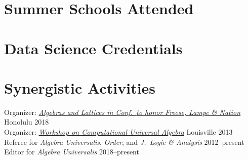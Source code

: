 \documentclass[margin,line]{resume}
\begin{document}
\begin{resume}

\vspace{-1mm}    
    \section{\mysidestyle Summer Schools Attended}

    

\vspace{-1mm}    
    \section{\mysidestyle Data Science Credentials}

    


    \section{\mysidestyle Synergistic Activities}


    \newcommand{\mytab}{\phantom{\textsl{Activities: }}}
    \renewcommand{\mytab}{\phantom{XX}}
    Organizer: \href{https://universalalgebra.github.io/ALH-2018/}
    {\emph{Algebras and Lattices in \Hawaii Conf.~{\small to honor Freese, Lampe \& Nation}}} \hfill  Honolulu 2018
    \\
    Organizer: \href{http://universalalgebra.wordpress.com/meetings/2013-workshop-on-computational-universal-algebra/}
    {\emph{Workshop on Computational Universal Algebra}} \hfill  Louisville 2013
    \\
    Referee for {\it Algebra Universalis}, {\it Order}, and {\it J.~Logic \& Analysis} \hfill 2012--present
    \\
    Editor for {\it Algebra Universalis} \hfill 2018--present


\end{resume}
\end{document}
